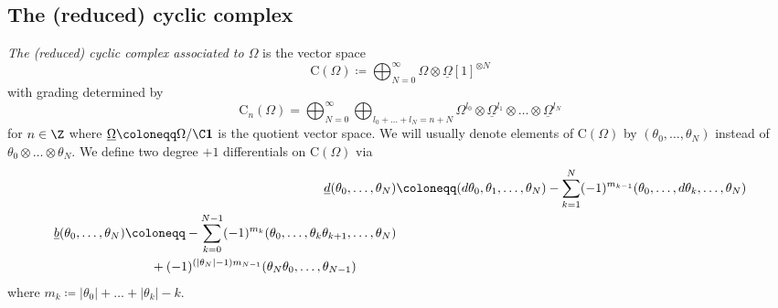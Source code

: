 \documentclass[a4paper, english, 12pt, bibliography=totocnumbered,
index=totoc]{scrartcl}
\begin{document}
\subsection{The (reduced) cyclic complex}\label{Section: cyclic complex}
\textit{The (reduced) cyclic complex associated to $\Omega$} is the vector 
space
\begin{equation*}
	\mathrm{C}(\Omega) \coloneqq \bigoplus_{N=0}^{\infty}\Omega \otimes
	\underline{\Omega}[1]^{\otimes N}
\end{equation*}
with grading determined by
\begin{equation*}
	\mathrm{C}_n(\Omega) = \bigoplus_{N=0}^{\infty} \bigoplus_{l_0 + \ldots +
		l_N = n + N} \Omega^{l_0} \otimes \underline{\Omega}^{l_1} \otimes
	\ldots
	\otimes \underline{\Omega}^{l_N}
\end{equation*}
for $n \in \Z$ where $\underline{\Omega} \coloneqq \Omega / \C \mathbf{1}$ is
the quotient vector space.
We will usually denote elements of $\mathrm{C}(\Omega)$ by $(\theta_0,
\ldots, \theta_N)$ instead of $\theta_0 \otimes \ldots \otimes \theta_N$.
We define two degree $+1$ differentials on $\mathrm{C}(\Omega)$ via
\begin{align}
	\underline{d}(\theta_0, \ldots, \theta_N) & \coloneqq (d
	\theta_0, \theta_1, \ldots, \theta_N) - \sum_{k=1}^N
	(-1)^{m_{k-1}}(\theta_0, \ldots, d
	\theta_k, \ldots, \theta_N) \notag \\
	\begin{split}\label{Definition bunderline}
		\underline{b}(\theta_0, \ldots, \theta_N) & \coloneqq
		-\sum_{k=0}^{N-1}(-1)^{m_{k}}(\theta_0, \ldots, \theta_k
		\theta_{k+1},
		\ldots, \theta_N) \\
		& \qquad + (-1)^{(\lvert \theta_{N} \rvert - 1)
			m_{N-1}}(\theta_N\theta_0, \ldots,\theta_{N-1})
	\end{split}
\end{align}
where $m_k \coloneqq \lvert \theta_0 \rvert + \ldots + \lvert \theta_k \rvert
- k$.
\end{document}
